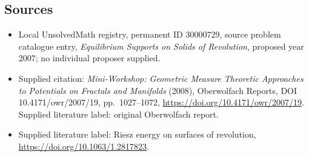 \documentclass[11pt]{article}
\begin{document}
\subsection{Sources}
\begin{itemize}\item Local UnsolvedMath registry, permanent ID 30000729, source problem catalogue entry, \emph{Equilibrium Supports on Solids of Revolution}, proposed year 2007; no individual proposer supplied.\item Supplied citation: \emph{Mini-Workshop: Geometric Measure Theoretic Approaches to Potentials on Fractals and Manifolds} (2008), Oberwolfach Reports, DOI 10.4171/owr/2007/19, pp.\ 1027--1072, \url{https://doi.org/10.4171/owr/2007/19}. Supplied literature label: original Oberwolfach report.\item Supplied literature label: Riesz energy on surfaces of revolution, \url{https://doi.org/10.1063/1.2817823}.\end{itemize}
\end{document}
